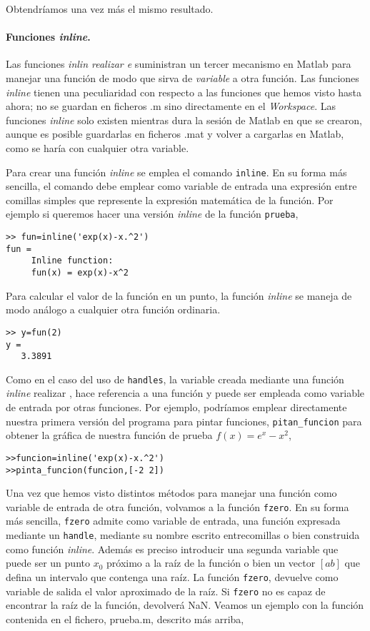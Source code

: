 Obtendríamos una vez más el mismo resultado.

\paragraph{Funciones \emph{inline}.}  Las funciones \emph{inlin realizar e} suministran un tercer mecanismo en Matlab para manejar una función de modo que sirva de \emph{variable}  a otra función. Las funciones \emph{inline} tienen una peculiaridad con respecto a las funciones que hemos visto hasta ahora; no se guardan en ficheros .m sino directamente en el \emph{Workspace}. Las funciones \emph{inline} solo existen mientras dura la sesión de Matlab en que se crearon, aunque es posible guardarlas en ficheros .mat y volver a cargarlas en Matlab, como se haría con cualquier otra variable.

Para crear una función \emph{inline} se emplea el comando \texttt{inline}. En su forma más sencilla, el comando debe emplear como variable de entrada una expresión entre comillas simples que represente la expresión matemática de la función. Por ejemplo si queremos hacer una versión \emph{inline} de la función \texttt{prueba},
\begin{verbatim}
>> fun=inline('exp(x)-x.^2')
fun =
     Inline function:
     fun(x) = exp(x)-x^2
\end{verbatim}

Para calcular el valor de la función en un punto, la función \emph{inline} se maneja de  modo análogo a cualquier otra función ordinaria.

\begin{verbatim}
>> y=fun(2)
y =
   3.3891
\end{verbatim}

Como en el caso del uso de \texttt{handles}, la variable creada mediante una función \emph{inline} realizar , hace referencia a una función y puede ser empleada como variable  de entrada por otras funciones. Por ejemplo, podríamos emplear directamente nuestra primera versión del programa para pintar funciones, \texttt{pitan\_funcion} para obtener la gráfica de nuestra función de prueba $f(x)=e^x-x^2$,

\begin{verbatim}
>>funcion=inline('exp(x)-x.^2')
>>pinta_funcion(funcion,[-2 2])
\end{verbatim}

Una vez que hemos visto distintos métodos para manejar una función como variable de entrada de otra función, volvamos a la función \texttt{fzero}. En su forma más sencilla, \texttt{fzero} admite como variable de entrada, una función expresada mediante un \texttt{handle}, mediante su nombre escrito entrecomillas o bien construida como función \emph{inline}. Además es preciso introducir una segunda variable que puede ser un punto $x_0$ próximo a la raíz de la función o bien un vector $[a b]$ que defina un intervalo que contenga una raíz. La función \texttt{fzero}, devuelve como variable de salida el valor aproximado de la raíz. Si \texttt{fzero} no es capaz de encontrar la raíz de la función, devolverá NaN. Veamos un ejemplo con la función contenida en el fichero, prueba.m, descrito más arriba,

